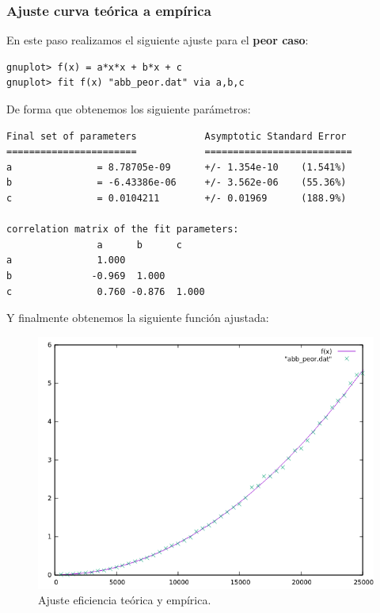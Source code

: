 \subsubsection{Ajuste curva teórica a empírica}

En este paso realizamos el siguiente ajuste para el \textbf{peor caso}:
\begin{shaded*}
\begin{verbatim}
gnuplot> f(x) = a*x*x + b*x + c
gnuplot> fit f(x) "abb_peor.dat" via a,b,c

\end{verbatim}
\end{shaded*}

De forma que obtenemos los siguiente parámetros:

\begin{shaded*}
\begin{verbatim}
Final set of parameters            Asymptotic Standard Error
=======================            ==========================
a               = 8.78705e-09      +/- 1.354e-10    (1.541%)
b               = -6.43386e-06     +/- 3.562e-06    (55.36%)
c               = 0.0104211        +/- 0.01969      (188.9%)

correlation matrix of the fit parameters:
                a      b      c      
a               1.000 
b              -0.969  1.000 
c               0.760 -0.876  1.000 

\end{verbatim}
\end{shaded*}

Y finalmente obtenemos la siguiente función ajustada:
\begin{figure}[H]
    \begin{center}
        \includegraphics[scale=0.7]{imagenes/abb_adjp.png}
        \caption{Ajuste eficiencia teórica y empírica.}
        \label{fig20}
    \end{center}
\end{figure}

